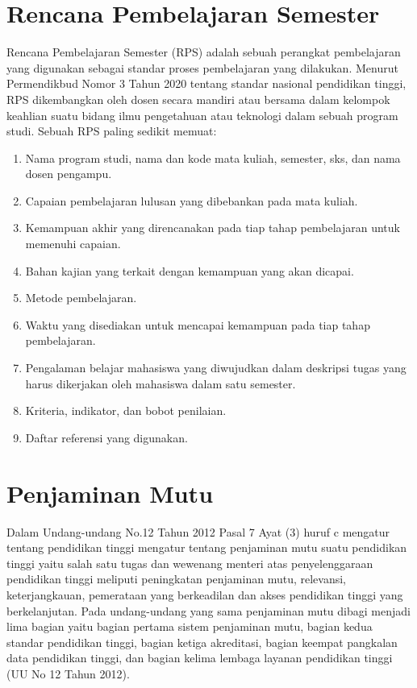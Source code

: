 \section{Rencana Pembelajaran Semester}

	Rencana Pembelajaran Semester (RPS) adalah sebuah perangkat pembelajaran yang digunakan sebagai standar proses pembelajaran yang dilakukan. Menurut Permendikbud Nomor 3 Tahun 2020 tentang standar nasional pendidikan tinggi, RPS dikembangkan oleh dosen secara mandiri atau bersama dalam kelompok keahlian suatu bidang ilmu pengetahuan atau teknologi dalam sebuah program studi. Sebuah RPS paling sedikit memuat: \citep{Kemendikbud2020}

\begin{enumerate}
	\item Nama program studi, nama dan kode mata kuliah, semester, sks, dan nama dosen pengampu.
	\item Capaian pembelajaran lulusan yang dibebankan pada mata kuliah.
	\item Kemampuan akhir yang direncanakan pada tiap tahap pembelajaran untuk memenuhi capaian.
	\item Bahan kajian yang terkait dengan kemampuan yang akan dicapai.
	\item Metode pembelajaran.
	\item Waktu yang disediakan untuk mencapai kemampuan pada tiap tahap pembelajaran.
	\item Pengalaman belajar mahasiswa yang diwujudkan dalam deskripsi tugas yang harus dikerjakan oleh mahasiswa dalam satu semester.
	\item Kriteria, indikator, dan bobot penilaian.
	\item Daftar referensi yang digunakan.
\end{enumerate}

\section{Penjaminan Mutu}

	Dalam Undang-undang No.12 Tahun 2012 Pasal 7 Ayat (3) huruf c mengatur tentang pendidikan tinggi mengatur tentang penjaminan mutu suatu pendidikan tinggi yaitu salah satu tugas dan wewenang menteri atas penyelenggaraan pendidikan tinggi meliputi peningkatan penjaminan mutu, relevansi, keterjangkauan, pemerataan yang berkeadilan dan akses pendidikan tinggi yang berkelanjutan. Pada undang-undang yang sama penjaminan mutu dibagi menjadi lima bagian yaitu bagian pertama sistem penjaminan mutu, bagian kedua standar pendidikan tinggi, bagian ketiga akreditasi, bagian keempat pangkalan data pendidikan tinggi, dan bagian kelima lembaga layanan pendidikan tinggi (UU No 12 Tahun 2012).


